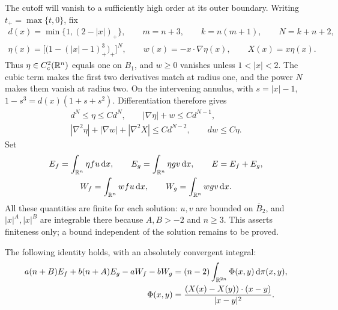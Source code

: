 The cutoff will vanish to a sufficiently high order at its outer boundary.
Writing \(t_+=\max\{t,0\}\), fix
\begin{equation}\label{eq:cutoff}
\begin{gathered}
  d(x)=\min\{1,(2-|x|)_+\},\qquad
  m=n+3,\qquad k=n(m+1),\qquad N=k+n+2,\\
  \eta(x)=\bigl[\bigl(1-(|x|-1)_+^3\bigr)_+\bigr]^N,
  \qquad w(x)=-x\cdot\nabla\eta(x),\qquad X(x)=x\eta(x).
\end{gathered}
\end{equation}
Thus \(\eta\in C_c^2(\mathbb R^n)\) equals one on \(B_1\), and \(w\ge0\)
vanishes unless \(1<|x|<2\). The cubic term makes the first two
derivatives match at radius one, and the power \(N\) makes them vanish
at radius two. On the intervening annulus, with \(s=|x|-1\),
\(1-s^3=d(x)(1+s+s^2)\). Differentiation therefore gives
\begin{equation}\label{eq:cutoff-bounds}
\begin{gathered}
  d^N\le\eta\le C d^N,\qquad
  |\nabla\eta|+w\le C d^{N-1},\\
  |\nabla^2\eta|+|\nabla w|+|\nabla^2X|\le C d^{N-2},
  \qquad dw\le C\eta.
\end{gathered}
\end{equation}
Set
\[
\begin{gathered}
  E_f=\int_{\mathbb R^n}\eta fu\,\mathrm d x,\qquad
  E_g=\int_{\mathbb R^n}\eta gv\,\mathrm d x,\qquad E=E_f+E_g,
  \\
  W_f=\int_{\mathbb R^n}wfu\,\mathrm d x,\qquad
  W_g=\int_{\mathbb R^n}wgv\,\mathrm d x.
\end{gathered}
\]
All these quantities are finite for each solution: \(u,v\) are bounded
on \(\overline B_2\), and \(|x|^A,|x|^B\) are integrable there because
\(A,B>-2\) and \(n\ge3\). This asserts finiteness only; a bound
independent of the solution remains to be proved.

\begin{lemma}
The following identity holds, with an absolutely convergent integral:
\begin{equation}\label{eq:virial}
\begin{split}
  a(n+B)E_f+b(n+A)E_g-aW_f-bW_g
    &=(n-2)\int_{\mathbb R^{2n}}\Phi(x,y)\,\mathrm d\pi(x,y),\\
  \Phi(x,y)&=
    \frac{(X(x)-X(y))\cdot(x-y)}{|x-y|^2}.
\end{split}
\end{equation}
\end{lemma}


